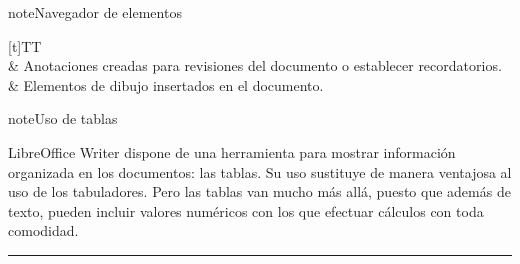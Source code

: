 \documentclass[letterpaper,10pt,spanish]{sphinxmanual}
\begin{document}
\begin{sphinxadmonition}{note}{Navegador de elementos}
\begin{savenotes}
\begin{tabulary}{\linewidth}[t]{TT}
\\
\sphinxhline
\sphinxAtStartPar
{}
&
\sphinxAtStartPar
Anotaciones creadas para revisiones del documento o establecer recordatorios.
\\
\sphinxhline
\sphinxAtStartPar
{}
&
\sphinxAtStartPar
Elementos de dibujo insertados en el documento.
\\
\sphinxbottomrule
\end{tabulary}
\sphinxtableafterendhook\par
\sphinxattableend\end{savenotes}
\end{sphinxadmonition}

\begin{sphinxadmonition}{note}{Uso de tablas}

\sphinxAtStartPar
LibreOffice Writer dispone de una herramienta para mostrar información organizada en los  documentos: las tablas. Su uso sustituye de manera ventajosa al uso de los tabuladores. Pero las tablas van mucho más allá, puesto que además de texto, pueden incluir valores numéricos con los que efectuar cálculos con toda comodidad.
\end{sphinxadmonition}


\bigskip\hrule\bigskip
\end{document}
